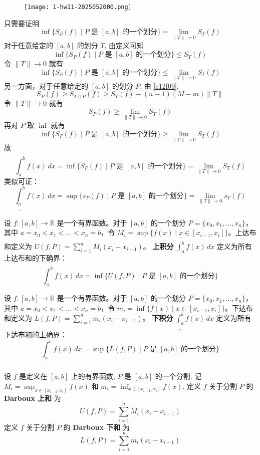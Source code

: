 \begin{exercise}
\begin{figure}[H]
\centering
\texttt{[image: 1-hw11-2025052000.png]}
\label{}
\end{figure}
\end{exercise}
只需要证明
\[
\inf \{ S_{P}(f)\mid P \text{ 是 } [a, b] \text{ 的一个划分} \}=\lim_{ \lVert T \rVert  \to 0 } S_{T}(f)
\]
对于任意给定的 $[a,b]$ 的划分 $T$, 由定义可知
\[
\inf \{ S_{P}(f)\mid P \text{ 是 } [a, b] \text{ 的一个划分} \}\leq S_{T}(f)
\]
令 $\lVert T \rVert\to0$ 就有
\[
\inf \{ S_{P}(f)\mid P \text{ 是 } [a, b] \text{ 的一个划分} \}\leq \lim_{ \lVert T \rVert  \to 0 } S_{T}(f)
\]
另一方面，对于任意给定的 $[a,b]$ 的划分 $P$, 由 \cref{e12f09},
\[
S_{P}(f)\geq S_{T\cup P}(f)\geq S_{T}(f)-(n-1)(M-m)\lVert T \rVert 
\]
令 $\lVert T \rVert\to0$ 就有
\[
S_{P}(f)\geq \lim_{ \lVert T \rVert  \to 0 } S_{T}(f)
\]
再对 $P$ 取 $\inf$ 就有
\[
\inf \{ S_{P}(f)\mid P \text{ 是 } [a, b] \text{ 的一个划分} \}\geq  \lim_{ \lVert T \rVert  \to 0 } S_{T}(f)
\]
故
\[
\overline{\int_a^b} f(x) \, dx=\inf \{ S_{P}(f)\mid P \text{ 是 } [a, b] \text{ 的一个划分} \}= \lim_{ \lVert T \rVert  \to 0 } S_{T}(f)
\]
类似可证：
\[
\underline{\int_a^b} f(x) \, dx =\sup \{ s_{P}(f)\mid P \text{ 是 } [a, b] \text{ 的一个划分} \}= \lim_{ \lVert T \rVert  \to 0 } s_{T}(f)
\]
\begin{definition}[上积分的定义]
设 $f: [a, b] \to \mathbb{R}$ 是一个有界函数。对于 $[a, b]$ 的一个划分 $P = \{x_0, x_1, \dots, x_n\}$，其中 $a = x_0 < x_1 < \dots < x_n = b$，令 $M_i = \sup \{ f(x) \mid x \in [x_{i-1}, x_i] \}$。上达布和定义为 $U(f, P) = \sum_{i=1}^n M_i (x_i - x_{i-1})$。
\textbf{上积分} $\overline{\int_a^b} f(x) \, dx$ 定义为所有上达布和的下确界：
\[
\overline{\int_a^b} f(x) \, dx = \inf \{ U(f, P) \mid P \text{ 是 } [a, b] \text{ 的一个划分} \}
\]
\end{definition}
\begin{definition}[下积分的定义]
设 $f: [a, b] \to \mathbb{R}$ 是一个有界函数。对于 $[a, b]$ 的一个划分 $P = \{x_0, x_1, \dots, x_n\}$，其中 $a = x_0 < x_1 < \dots < x_n = b$，令 $m_i = \inf \{ f(x) \mid x \in [x_{i-1}, x_i] \}$。下达布和定义为 $L(f, P) = \sum_{i=1}^n m_i (x_i - x_{i-1})$。
\textbf{下积分} $\underline{\int_a^b} f(x) \, dx$ 定义为所有下达布和的上确界：
\[
\underline{\int_a^b} f(x) \, dx = \sup \{ L(f, P) \mid P \text{ 是 } [a, b] \text{ 的一个划分} \}
\]
\end{definition}
\begin{definition}
设 $f$ 是定义在 $[a,b]$ 上的有界函数, $P$ 是 $[a,b]$ 的一个分割. 记 $M_i = \sup_{x \in [x_{i-1}, x_i]} f(x)$ 和 $m_i = \inf_{x \in [x_{i-1}, x_i]} f(x)$. 定义 $f$ 关于分割 $P$ 的 \textbf{Darboux 上和} 为
\[
U(f,P) = \sum_{i=1}^n M_i (x_i - x_{i-1})
\]定义 $f$ 关于分割 $P$ 的 \textbf{Darboux 下和} 为
\[
L(f,P) = \sum_{i=1}^n m_i (x_i - x_{i-1})
\]
\end{definition}
